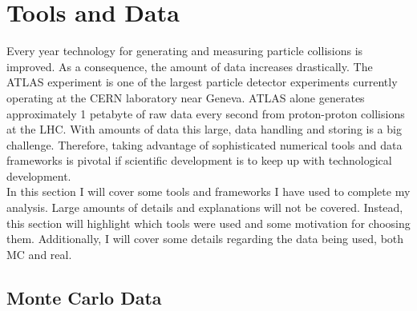 \section{Tools and Data}
Every year technology for generating and measuring particle collisions is improved. 
As a consequence, the amount of data increases drastically. The ATLAS experiment
is one of the largest particle detector experiments currently operating at the 
CERN laboratory near Geneva. ATLAS alone generates approximately 1 petabyte of raw
data every second from proton-proton collisions at the \ac{LHC}. 
With amounts of data this large, data handling and storing is a big challenge. 
Therefore, taking advantage of sophisticated numerical tools and data frameworks is
pivotal if scientific development is to keep up with technological development.
\\
In this section I will cover some tools and frameworks I have used to 
complete my analysis. Large amounts of details and explanations will not be covered. 
Instead, this section will highlight which tools were used and some motivation
for choosing them. Additionally, I will cover some details regarding the data
being used, both \ac{MC} and real.
\subsection{Monte Carlo Data}
